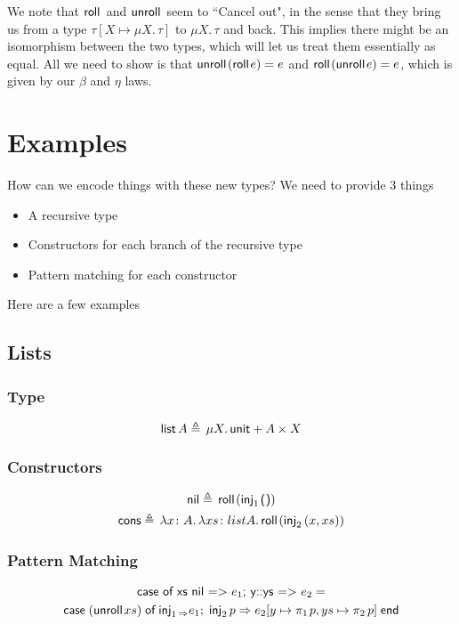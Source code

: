 \documentclass{lecturenotes}
\newcommand{\tabs}[3]{\ensuremath{\lambda #1 \colon #2.\,#3}}
\newcommand{\utype}{\textsf{unit}\xspace}
\newcommand{\unit}{\ensuremath{\textsf{(}\mkern0.5mu\textsf{)}}}
\newcommand{\prodtype}[2]{\ensuremath{#1 \times #2}}
\newcommand{\pair}[2]{\ensuremath{(#1, #2)}}
\newcommand{\projl}[1]{\ensuremath{\pi_1\mkern2mu#1}}
\newcommand{\projr}[1]{\ensuremath{\pi_2\mkern3mu#1}}
\newcommand{\sumtype}[2]{\ensuremath{#1 + #2}}
\newcommand{\injl}[1]{\ensuremath{\textsf{inj}_1\mkern2mu#1}}
\newcommand{\injr}[1]{\ensuremath{\textsf{inj}_2\mkern3mu#1}}
\newcommand{\case}[5]{\ensuremath{\textsf{case}\mkern5mu#1\mkern5mu\textsf{of}\mkern5mu\injl{#2} \Rightarrow #3;\mkern5mu\injr{#4} \Rightarrow #5\mkern5mu\textsf{end}}}
\newcommand{\rectype}[2]{\ensuremath{\mu #1.\,#2}}
\newcommand{\roll}[1]{\textsf{roll}\mkern2mu#1}
\newcommand{\unroll}[1]{\textsf{unroll}\mkern2mu#1}
\begin{document}
We note that $\roll{ }$ and $\unroll{ }$ seem to ``Cancel out", in the sense that they bring us from a type $\tau[X \mapsto \rectype{X}{\tau}]$ to $\rectype{X}{\tau}$ and back.
This implies there might be an isomorphism between the two types, which will let us treat them essentially as equal.
All we need to show is that $\unroll{(\roll{e})} = e$ and $\roll{(\unroll{e})} = e$, which is given by our $\beta$ and $\eta$ laws.

\section{Examples}
How can we encode things with these new types?
We need to provide 3 things
\begin{itemize}
  \item A recursive type
  \item Constructors for each branch of the recursive type
  \item Pattern matching for each constructor
\end{itemize}
Here are a few examples
\subsection{Lists}
\subsubsection{Type}
\[
  \textsf{list}\, A \triangleq\, \rectype{X}{\sumtype{\utype}{\prodtype{A}{X}}}\\
\]

\subsubsection{Constructors}
\begin{gather*}
  \textsf{nil} \triangleq\, \roll{(\injl{\unit})}\\
  \textsf{cons} \triangleq\, \tabs{x}{A}{\tabs{xs}{list A}{\roll{(\injr{\pair{x}{xs}})}}}
\end{gather*}

\subsubsection{Pattern Matching}

\begin{gather*}
  \textsf{case of xs nil => $e_1$; y::ys => $e_2$} =\\
  \textsf{\case{(\unroll{xs})}{_}{e_1}{p}{e_2[y \mapsto \projl{p}, ys \mapsto \projr{p}]}}
\end{gather*}
\end{document}
